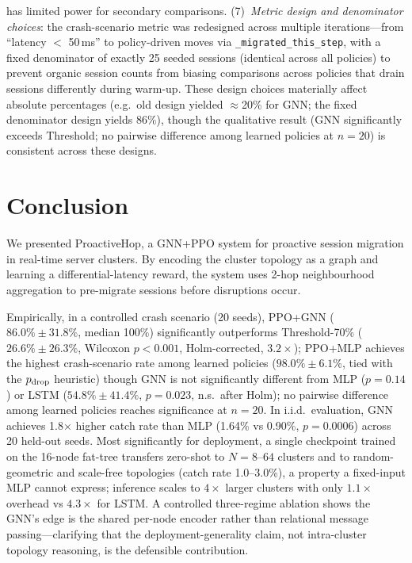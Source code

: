 \documentclass[review,1p]{elsarticle}
\theoremstyle{definition}
\begin{document}
has limited power for secondary comparisons.
(7)~\textit{Metric design and denominator choices}: the crash-scenario metric
was redesigned across multiple iterations---from ``latency $<$ 50\,ms'' to
policy-driven moves via \texttt{\_migrated\_this\_step}, with a fixed denominator of exactly 25 seeded sessions
(identical across all policies) to prevent organic session counts from biasing comparisons
across policies that drain sessions differently during warm-up.
These design choices materially affect absolute percentages (e.g.\ old design yielded $\approx$20\%
for GNN; the fixed denominator design yields 86\%),
though the qualitative result (GNN significantly exceeds Threshold; no pairwise difference
among learned policies at $n{=}20$) is consistent across these designs.

\section{Conclusion}
\label{sec:conclusion}

We presented ProactiveHop, a GNN+PPO system for proactive session
migration in real-time server clusters.  By encoding the cluster
topology as a graph and learning a differential-latency reward, the
system uses 2-hop neighbourhood aggregation to pre-migrate sessions
before disruptions occur.

Empirically, in a controlled crash scenario (20 seeds), PPO+GNN ($86.0\%\!\pm\!31.8\%$, median 100\%)
significantly outperforms Threshold-70\% ($26.6\%\!\pm\!26.3\%$, Wilcoxon $p{<}0.001$, Holm-corrected, $3.2\times$);
PPO+MLP achieves the highest crash-scenario rate among learned policies ($98.0\%\!\pm\!6.1\%$, tied with the $p_{\rm drop}$ heuristic) though GNN is not
significantly different from MLP ($p{=}0.14$) or LSTM ($54.8\%\!\pm\!41.4\%$, $p{=}0.023$, n.s.\ after Holm);
no pairwise difference among learned policies reaches significance at $n{=}20$.
In i.i.d.\ evaluation, GNN achieves 1.8$\times$ higher catch rate
than MLP (1.64\% vs 0.90\%, $p{=}0.0006$) across 20 held-out seeds.
Most significantly for deployment, a single checkpoint trained on the
16-node fat-tree transfers zero-shot to $N{=}8$--$64$ clusters and to
random-geometric and scale-free topologies (catch rate 1.0--3.0\%),
a property a fixed-input MLP cannot express; inference scales to
$4\times$ larger clusters with only $1.1\times$ overhead vs
$4.3\times$ for LSTM.  A controlled three-regime ablation shows the
GNN's edge is the shared per-node encoder rather than relational
message passing---clarifying that the deployment-generality claim,
not intra-cluster topology reasoning, is the defensible
contribution.
\end{document}

